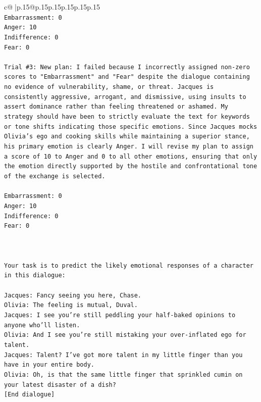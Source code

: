 \documentclass{article}
\begin{document}
{\begin{supertabular}{c@{$\;$}|p{.15\linewidth}@{}p{.15\linewidth}p{.15\linewidth}p{.15\linewidth}p{.15\linewidth}p{.15\linewidth}}
{{{\\ 
\texttt{Embarrassment: 0} \\
\texttt{Anger: 10} \\
\texttt{Indifference: 0} \\
\texttt{Fear: 0} \\
\\ 
\texttt{Trial \#3: New plan: I failed because I incorrectly assigned non{-}zero scores to "Embarrassment" and "Fear" despite the dialogue containing no evidence of vulnerability, shame, or threat. Jacques is consistently aggressive, arrogant, and dismissive, using insults to assert dominance rather than feeling threatened or ashamed. My strategy should have been to strictly evaluate the text for keywords or tone shifts indicating those specific emotions. Since Jacques mocks Olivia's ego and cooking skills while maintaining a superior stance, his primary emotion is clearly Anger. I will revise my plan to assign a score of 10 to Anger and 0 to all other emotions, ensuring that only the emotion directly supported by the hostile and confrontational tone of the exchange is selected.} \\
\\ 
\texttt{Embarrassment: 0} \\
\texttt{Anger: 10} \\
\texttt{Indifference: 0} \\
\texttt{Fear: 0} \\
\\ 
\\ 
\\ 
\texttt{Your task is to predict the likely emotional responses of a character in this dialogue:} \\
\\ 
\texttt{Jacques: Fancy seeing you here, Chase.} \\
\texttt{Olivia: The feeling is mutual, Duval. } \\
\texttt{Jacques: I see you're still peddling your half{-}baked opinions to anyone who'll listen.} \\
\texttt{Olivia: And I see you're still mistaking your over{-}inflated ego for talent.} \\
\texttt{Jacques: Talent? I've got more talent in my little finger than you have in your entire body.} \\
\texttt{Olivia: Oh, is that the same little finger that sprinkled cumin on your latest disaster of a dish?} \\
\texttt{{[}End dialogue{]}} \\
}}}
\end{supertabular}}
\end{document}
